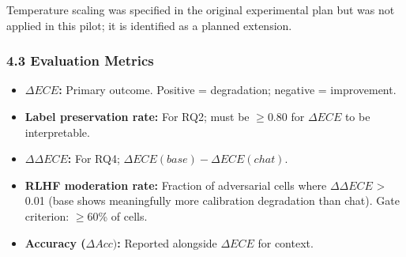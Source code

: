 Temperature scaling was specified in the original experimental plan but was not applied in this pilot; it is identified as a planned extension.

\subsubsection{4.3 Evaluation Metrics}

\begin{itemize}
\item \textbf{$\Delta ECE$:} Primary outcome. Positive = degradation; negative = improvement.
\item \textbf{Label preservation rate:} For RQ2; must be $\geq 0.80$ for $\Delta ECE$ to be interpretable.
\item \textbf{$\Delta \Delta ECE$:} For RQ4; $\Delta ECE(base) - \Delta ECE(chat)$.
\item \textbf{RLHF moderation rate:} Fraction of adversarial cells where $\Delta \Delta ECE$ > 0.01 (base shows meaningfully more calibration degradation than chat). Gate criterion: $\geq 60$\% of cells.
\item \textbf{Accuracy ($\Delta Acc)$:} Reported alongside $\Delta ECE$ for context.
\end{itemize}


